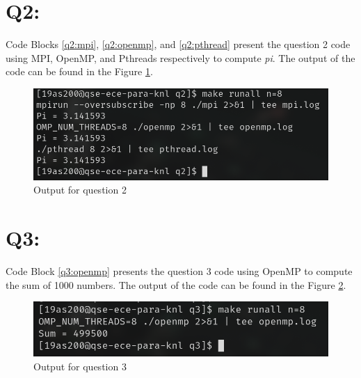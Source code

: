 \documentclass[11pt]{article}
\begin{document}
\newpage

\section*{Q2:}

Code Blocks \ref{q2:mpi}, \ref{q2:openmp}, and \ref{q2:pthread} present the question 2 code using MPI, OpenMP, and Pthreads respectively to compute \textit{pi}.
The output of the code can be found in the Figure \ref{fig:q2}.





\begin{figure}[ht]
\centering
    \includegraphics[width=\textwidth]{./images/q2.png}
\caption{Output for question 2}
\label{fig:q2}
\end{figure}

\section*{Q3:}
Code Block \ref{q3:openmp} presents the question 3 code using OpenMP to compute the sum of 1000 numbers.
The output of the code can be found in the Figure \ref{fig:q3}.



\begin{figure}[ht]
\centering
    \includegraphics[width=\textwidth]{./images/q3.png}
\caption{Output for question 3}
\label{fig:q3}
\end{figure}
\end{document}
